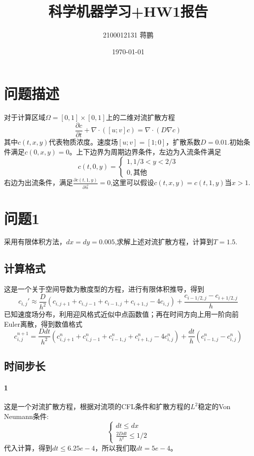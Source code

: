 \documentclass[11pt,a4 paper,one side]{article}
\title{科学机器学习+HW1报告}
\author{2100012131 蒋鹏}
\date{\today}
\begin{document}
\maketitle
\tableofcontents
\section{问题描述}
对于计算区域$\Omega=[0,1]\times [0,1]$上的二维对流扩散方程\begin{equation}
    \frac{\partial c}{\partial t}+\nabla \cdot ([u;v]c) = \nabla \cdot(D\nabla c)
\end{equation}
其中$c(t,x,y)$代表物质浓度。速度场$[u;v]=[1;0]$，扩散系数$D=0.01$.初始条件满足$c(0,x,y)=0$。上下边界为周期边界条件，左边为入流条件满足\begin{equation}
    c(t,0,y)=\begin{cases}
        1,1/3<y<2/3 \\ 0,\text{其他}
    \end{cases}
\end{equation}
右边为出流条件，满足$\frac{\partial c(t,1,y)}{\partial \vec{n}}=0$,这里可以假设$c(t,x,y)=c(t,1,y)$当$x>1$.
\section{问题1}
采用有限体积方法，$dx=dy=0.005$,求解上述对流扩散方程，计算到$T=1.5$.
\subsection{计算格式}
这是一个关于空间导数为散度型的方程，进行有限体积推导，得到\begin{equation}
    c_{i,j}'\approx \frac{D}{h^2}(c_{i,j+1}+c_{i,j-1}+c_{i-1,j}+c_{i+1,j}-4c_{i,j})+\frac{c_{i-1/2,j}-c_{i+1/2,j}}{h}
\end{equation}
已知速度场分布，利用迎风格式近似中点函数值；再在时间方向上用一阶向前Euler离散，得到数值格式\begin{equation}
    c_{i,j}^{n+1} = \frac{Ddt}{h^2}(c_{i,j+1}^n+c_{i,j-1}^n+c_{i-1,j}^n+c_{i+1,j}^n-4c_{i,j}^n)+\frac{dt}{h}(c_{i-1,j}^n-c_{i,j}^n)
\end{equation}
\subsection{时间步长}
\paragraph{1}这是一个对流扩散方程，根据对流项的CFL条件和扩散方程的$L^2$稳定的Von Neumann条件:\begin{equation}
    \begin{cases}
        dt \leq dx \\ \frac{2Ddt}{h^2}\leq 1/2
    \end{cases}
\end{equation}
代入计算，得到$dt\leq 6.25e-4$，所以我们取$dt=5e-4$。
\end{document}
